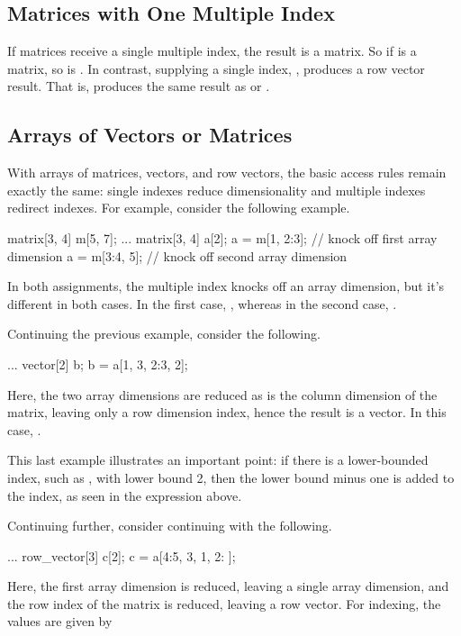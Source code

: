 \subsection{Matrices with One Multiple Index}

If matrices receive a single multiple index, the result is a matrix.
So if  is a matrix, so is .  In contrast,
supplying a single index, , produces a row vector result.
That is,  produces the same result as 
or .

\subsection{Arrays of Vectors or Matrices}

With arrays of matrices, vectors, and row vectors, the basic access
rules remain exactly the same: single indexes reduce dimensionality
and multiple indexes redirect indexes.  For example, consider the
following example.
%
\begin{stancode}
matrix[3, 4] m[5, 7];
...
matrix[3, 4] a[2];
a = m[1, 2:3];  // knock off first array dimension
a = m[3:4, 5];  // knock off second array dimension
\end{stancode}
%
In both assignments, the multiple index knocks off an array dimension,
but it's different in both cases.  In the first case, , whereas in the second case, .

Continuing the previous example, consider the following.
%
\begin{stancode}
...
vector[2] b;
b = a[1, 3, 2:3, 2];
\end{stancode}
%
Here, the two array dimensions are reduced as is the column dimension
of the matrix, leaving only a row dimension index, hence the result is
a vector.  In this case, .

This last example illustrates an important point: if there is a
lower-bounded index, such as , with lower bound 2, then the
lower bound minus one is added to the index, as seen in the  expression above.

Continuing further, consider continuing with the following.
%
\begin{stancode}
...
row_vector[3] c[2];
c = a[4:5, 3, 1, 2: ];
\end{stancode}
%
Here, the first array dimension is reduced, leaving a single array
dimension, and the row index of the matrix is reduced, leaving a row
vector.  For indexing, the values are given by


